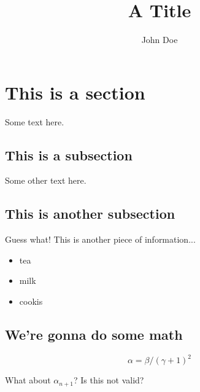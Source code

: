 \documentclass{article}
\title{A Title}
\author{John Doe}
\begin{document}
\maketitle

\section{This is a section}

Some text here.

\subsection{This is a subsection}

Some other text here.

\subsection{This is another subsection}

Guess what!
This is another piece of information...

\begin{itemize}
    \item tea
    \item milk
    \item cookis
\end{itemize}

\subsection{We're gonna do some math}
\begin{equation}
    \alpha = \beta /(\gamma + 1)^2
\end{equation}

What about $\alpha_{n+1}$? Is this not valid? 
\end{document}
